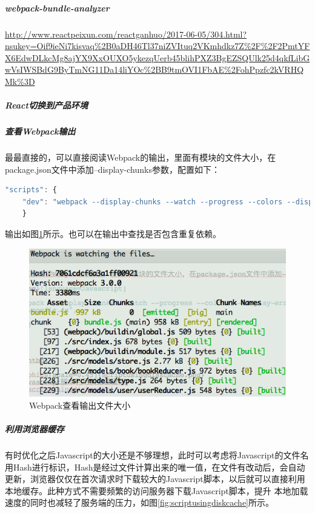 \documentclass[11pt,fleqn]{book}
\numberwithin{dummy}{section}
\theoremstyle{ocrenumbox}
\theoremstyle{blacknumex}
\theoremstyle{blacknumbox}
\theoremstyle{ocrenum}
\begin{document}
\subparagraph{webpack-bundle-analyzer}

\url{http://www.reactpeixun.com/reactganhuo/2017-06-05/304.html?nsukey=Oif9ieNi7kisvaq%2B0aDH46Tl37niZVItuq2VKmhdkz7Z%2F%2F2PmtYFX6EdwDLkcMg8ajYX9XxOUXO5ykezqUerb45blihPXZ3BgEZSQUlk25d4qkfLibGwVsIWSBdG9ByTmNG11Da14liYOc%2BB9tmOVI1FbAE%2FohPpzfc2kVRHQMk%3D}
	
	\subparagraph{React切换到产品环境}
	
	\subparagraph{查看Webpack输出}
	
	最最直接的，可以直接阅读Webpack的输出，里面有模块的文件大小，在package.json文件中添加--display-chunks参数，配置如下：
	
	\begin{lstlisting}[language=Javascript]
	"scripts": {
	"dev": "webpack --display-chunks --watch --progress --colors --display-error-details --config webpack/dev.config.js",
	}
	\end{lstlisting}
	
	
	输出如图\ref{fig:webpackcheckingfilesize}所示。也可以在输出中查找是否包含重复依赖。
	
	\begin{figure}[htbp]
		\centering
		\includegraphics[scale=0.7]{webpackcheckingfilesize.png}
		\caption{Webpack查看输出文件大小}
		\label{fig:webpackcheckingfilesize}
	\end{figure}
	
	
	\subparagraph{利用浏览器缓存}
	
	有时优化之后Javascript的大小还是不够理想，此时可以考虑将Javascript的文件名用Hash进行标识，Hash是经过文件计算出来的唯一值，在文件有改动后，会自动更新，浏览器仅仅在首次请求时下载较大的Javascript脚本，以后就可以直接利用本地缓存。此种方式不需要频繁的访问服务器下载Javascript脚本，提升 本地加载速度的同时也减轻了服务端的压力，如图\ref{fig:scriptusingdiskcache}所示。
	
\end{document}

